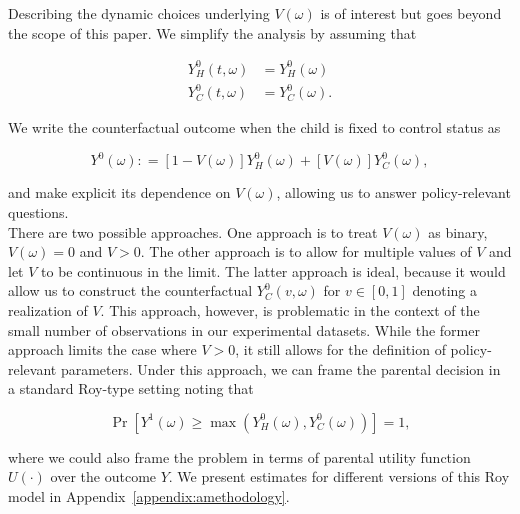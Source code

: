 \noindent Describing the dynamic choices underlying $V \left ( \omega \right)$ is of interest but goes beyond the scope of this paper. We simplify the analysis by assuming that 

\begin{align}
Y_H^0 \left( t, \omega \right) &= Y_H^0 \left( \omega \right) \nonumber \\
Y_C^0 \left( t, \omega \right) &= Y_C^0 \left( \omega \right).
\end{align}

\noindent We write the counterfactual outcome when the child is fixed to control status as 

\begin{equation}
Y^0 \left( \omega \right) : = \left[ 1 - V \left( \omega \right) \right] Y_H^0 \left( \omega \right) + \left[ V \left( \omega \right) \right] Y_C^0 \left( \omega \right), 
\end{equation}

\noindent and make explicit its dependence on $V \left( \omega \right)$, allowing us to answer policy-relevant questions.\\

\noindent There are two possible approaches. One approach is to treat $V \left( \omega \right)$ as binary, $V \left( \omega \right) = 0$ and $V > 0$. The other approach is to allow for multiple values of $V$ and let $V$ to be continuous in the limit. The latter approach is ideal, because it would allow us to construct the counterfactual $Y_C^0 \left( v,  \omega \right) $ for $v \in [0 , 1]$ denoting a realization of $V$. This approach, however, is problematic in the context of the small number of observations in our experimental datasets. While the former approach limits the case where $V > 0$, it still allows for the definition of policy-relevant parameters. Under this approach, we can frame the parental decision in a standard Roy-type setting noting that 

\begin{equation}
\Pr \left[ Y^1 \left( \omega \right) \geq \max \left(  Y_{H}^0 \left( \omega \right) ,  Y_{C}^0 \left( \omega \right)   \right) \right] = 1, \label{eq:noutility}
\end{equation}

\noindent where we could also frame the problem in terms of parental utility function $U \left( \cdot \right) $ over the outcome $Y$. We present estimates for different versions of this Roy model in Appendix~\ref{appendix:amethodology}.\\ 

